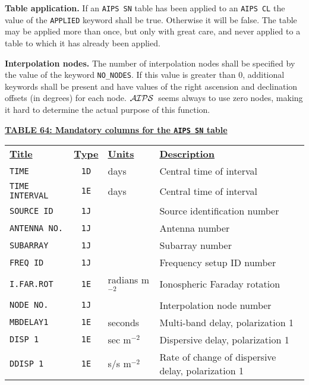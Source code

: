 \documentclass[twoside]{article}
\newcommand{\Hi}[1]{\textcolor{hicol}{#1}}
\newcommand{\AIPS}{{$\cal AIPS\/$}}
\begin{document}
{\bf Table application. } If an {\tt AIPS SN} table has been applied
to an {\tt AIPS CL} the value of the {\tt APPLIED} keyword shall be
true.  Otherwise it will be false.  The table may be applied more than
once, but only with great care, and never applied to a table to which
it has already been applied.

{\bf Interpolation nodes.} The number of interpolation nodes shall be
specified by the value of the keyword {\tt NO\_NODES}\@.  If this
value is greater than 0, additional keywords shall be present and have
values of the right ascension and declination offsets (in degrees) for
each node.  \AIPS\ seems always to use zero nodes, making it hard to
determine the actual purpose of this function.

\begin{center}
\underline{\bf{TABLE 64: Mandatory columns for the {\tt AIPS SN} table}}\\
\begin{tabular}{lcll}
\noalign{\vspace{2pt}} \label{ta:SNcols}
\underline{{\bf Title\vphantom{y}}} & \underline{\bf{Type}} &
   \underline{{\bf Units\vphantom{y}}} & \underline{\bf{Description}} \\
\noalign{\vspace{2pt}}
{\tt TIME}          & {\tt 1D} & days & Central time of interval \\
{\tt TIME INTERVAL} & {\tt 1E} & days & Central time of interval \\
{\tt SOURCE ID}     & {\tt 1J} &      & Source identification number \\
{\tt ANTENNA NO.}   & {\tt 1J} &      & Antenna number \\
{\tt SUBARRAY}      & {\tt 1J} &      & Subarray number \\
{\tt FREQ ID}       & {\tt 1J} &      & Frequency setup ID number \\
{\tt I.FAR.ROT}     & {\tt 1E} & radians m$^{-2}$ & Ionospheric Faraday rotation \\
{\tt NODE NO.}      & {\tt 1J} &      & Interpolation node number \\
{\tt MBDELAY1}      & {\tt 1E} & seconds & Multi-band delay, polarization 1 \\
\Hi{{\tt DISP 1}}   & \Hi{{\tt 1E}} & \Hi{sec m$^{-2}$} & \Hi{Dispersive delay, polarization 1} \\
\Hi{{\tt DDISP 1}}  & \Hi{{\tt 1E}} & \Hi{s/s m$^{-2}$} & \Hi{Rate of change of dispersive delay, polarization 1} \\

\end{tabular}
\end{center}
\end{document}

